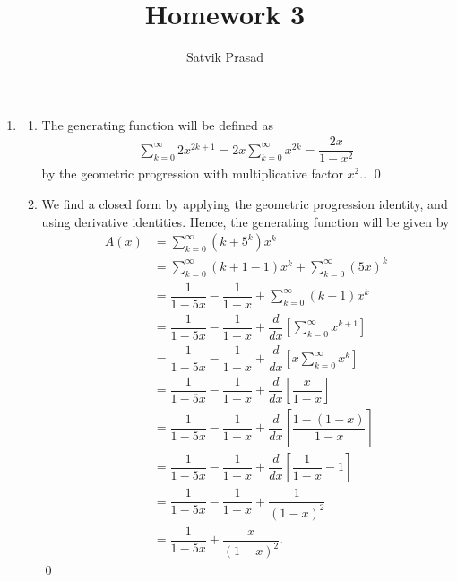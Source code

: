 \documentclass[12pt]{article}
\title{Homework 3}
\author{Satvik Prasad}
\date{}
\begin{document}
\begin{enumerate}
  \item
    \begin{enumerate}
      \item The generating function will be defined as
        \begin{align*}
          \sum_{k = 0}^{\infty} 2x^{2k + 1} = 2x\sum_{k = 0}^\infty
          x^{2k} = \dfrac{2x}{1-x^2}
        \end{align*}
        by the geometric progression with multiplicative factor $x^2.$. \qed

      \item We find a closed form by applying the geometric
        progression identity, and using derivative identities. Hence,
        the generating function will be given by
        \begin{align*}
          A(x) &= \sum_{k = 0}^{\infty}(k + 5^k)x^k \\
          &= \sum_{k = 0}^\infty (k + 1 - 1)x^k + \sum_{k = 0}^\infty (5x)^k \\
          &= \dfrac{1}{1-5x} - \dfrac{1}{1-x} + \sum_{k = 0}^\infty(k+1)x^k \\
          &= \dfrac{1}{1-5x} - \dfrac{1}{1-x} +
          \dfrac{d}{dx}\left[\sum_{k = 0}^{\infty} x^{k + 1}\right] \\
          &= \dfrac{1}{1-5x} - \dfrac{1}{1-x} +
          \dfrac{d}{dx}\left[x\sum_{k = 0}^{\infty} x^{k}\right] \\
          &= \dfrac{1}{1-5x} - \dfrac{1}{1-x} +
          \dfrac{d}{dx}\left[\dfrac{x}{1-x}\right] \\
          &= \dfrac{1}{1-5x} - \dfrac{1}{1-x} +
          \dfrac{d}{dx}\left[\dfrac{1-(1-x)}{1-x}\right] \\
          &= \dfrac{1}{1-5x} - \dfrac{1}{1-x} +
          \dfrac{d}{dx}\left[\dfrac{1}{1-x} - 1\right] \\
          &= \dfrac{1}{1-5x} - \dfrac{1}{1-x} + \dfrac{1}{(1-x)^2} \\
          &= \dfrac{1}{1-5x} + \dfrac{x}{(1-x)^2}.
        \end{align*}
        \qed
    \end{enumerate}


\end{enumerate}
\end{document}
